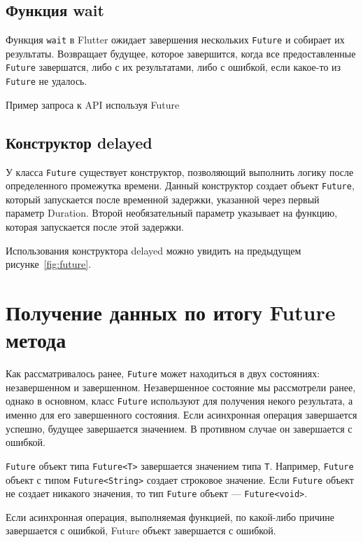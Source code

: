 \subsection{Функция wait}

Функция \texttt{wait}  в Flutter
ожидает завершения нескольких \texttt{Future} и собирает их результаты.
Возвращает будущее, которое завершится,
когда все предоставленные \texttt{Future} завершатся, либо с их результатами,
либо с ошибкой, если какое-то из \texttt{Future} не удалось.

\begin{image}
	\caption{Пример запроса к API используя Future}
	\label{fig:future}
\end{image}

\subsection{Конструктор delayed}

У класса \texttt{Future} существует конструктор,
позволяющий выполнить логику после определенного промежутка времени.
Данный конструктор создает объект \texttt{Future},
который запускается после временной задержки,
указанной через первый параметр Duration.
Второй необязательный параметр указывает на функцию,
которая запускается после этой задержки.

Использования конструктора delayed можно увидить на 
предыдущем рисунке~\ref{fig:future}.

\section{Получение данных по итогу Future метода}

Как рассматривалось ранее, \texttt{Future} может находиться в двух состояниях:
незавершенном и завершенном.
Незавершенное состояние мы рассмотрели ранее, однако в основном,
класс \texttt{Future} используют для получения некого результата,
а именно для его завершенного состояния.
Если асинхронная операция завершается успешно, будущее завершается значением.
В противном случае он завершается с ошибкой.\par
\texttt{Future} объект типа \texttt{Future<T>}
завершается значением типа \texttt{T}.
Например, \texttt{Future} объект
с типом \texttt{Future<String>} создает строковое значение.
Если \texttt{Future} объект не создает никакого значения,
то тип \texttt{Future} объект --- \texttt{Future<void>}.\par
Если асинхронная операция, выполняемая функцией,
по какой-либо причине завершается с ошибкой,
Future объект завершается с ошибкой.

